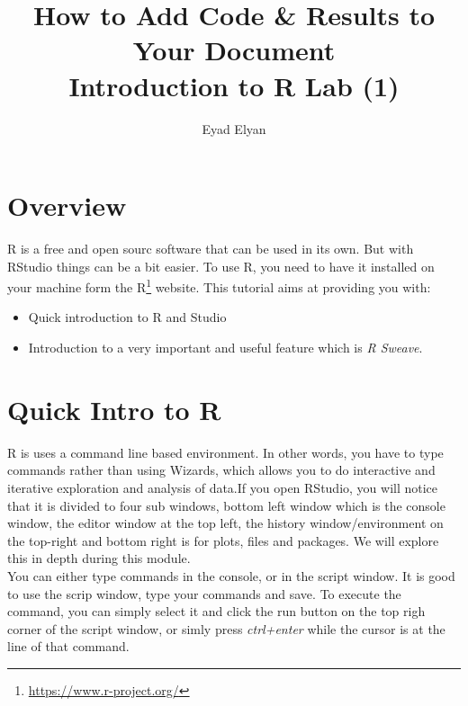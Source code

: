 \documentclass{article}\usepackage[]{graphicx}\usepackage[]{color}
\begin{document}
\title{How to Add Code \& Results to Your Document \\ Introduction to R Lab (1)}
\author{Eyad Elyan}

\maketitle

\section{Overview}

R is a free and open sourc software that can be used in its own. But with RStudio things can be a bit easier. To use R, you need to have it installed on your machine form the R\footnote{\href{https://www.r-project.org/}{https://www.r-project.org/}} website. This tutorial aims at providing you with:

\begin{itemize}
\item Quick introduction to R and Studio 
\item Introduction to a very important and useful feature which is \textit{R Sweave}. 
\end{itemize}



\section{Quick Intro to R}

R is uses a command line based environment. In other words, you have to type commands rather than using Wizards, which allows you to do interactive and iterative exploration and analysis of data.If you open RStudio, you will notice that it is divided to four sub windows, bottom left window which is the console window, the editor window at the top left, the history window/environment on the top-right and bottom right is for plots, files and packages. We will explore this in depth during this module.  \\


You can either type commands in the console, or in the script window. It is good to use the scrip window, type your commands and save. To execute the command, you can simply select it and click the run button on the top righ corner of the script window, or simly press \textit{ctrl+enter} while the cursor is at the line of that command. \\
\end{document}
